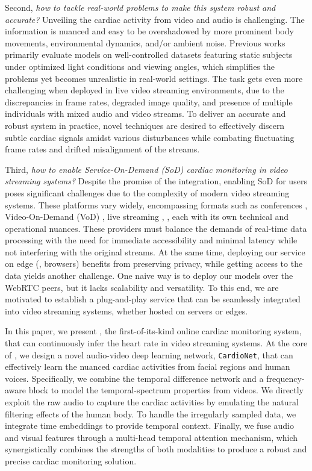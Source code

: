 Second, \textit{how to tackle real-world problems to make this system robust and accurate?} Unveiling the cardiac activity from video and audio is challenging. The information is nuanced and easy to be overshadowed by more prominent body movements, environmental dynamics, and/or ambient noise. Previous works \cite{liu2020multi, niu2020video, li2023learning, yu2023physformer++, liu2023efficientphys, zou2024rhythmformer} primarily evaluate models on well-controlled datasets featuring static subjects under optimized light conditions and viewing angles, which simplifies the problems yet becomes unrealistic in real-world settings. 
The task gets even more challenging when deployed in live video streaming environments, due to the discrepancies in frame rates, degraded image quality, and presence of multiple individuals with mixed audio and video streams. 
To deliver an accurate and robust system in practice, novel techniques are desired to effectively discern subtle cardiac signals amidst various disturbances while combating fluctuating frame rates and drifted misalignment of the streams. 

Third, \textit{how to enable Service-On-Demand (SoD) cardiac monitoring in video streaming systems?} Despite the promise of the integration,
enabling SoD for users poses significant challenges due to the complexity of modern video streaming systems. These platforms vary widely, encompassing formats such as conferences \cite{SkypeStayConnected, TeamsChannelsMicrosoft, OnePlatformConnect}, Video-On-Demand (VoD) \cite{StreamTVMovies, NetflixSingaporeWatch}, live streaming \cite{YouTube, ExploreFindYour}, \etc, each with its own technical and operational nuances. 
These providers must balance the demands of real-time data processing with the need for immediate accessibility and minimal latency while not interfering with the original streams. At the same time, deploying our service on edge (\eg, browsers) benefits from preserving privacy, while getting access to the data yields another challenge. One naive way is to deploy our models over the WebRTC peers, but it lacks scalability and versatility. To this end, we are motivated to establish a plug-and-play service that can be seamlessly integrated into video streaming systems, whether hosted on servers or edges. 



In this paper, we present \sysname, the first-of-its-kind online cardiac monitoring system, that can continuously infer the heart rate in video streaming systems. At the core of \sysname, we design a novel audio-video deep learning network, \texttt{CardioNet}, that can effectively learn the nuanced cardiac activities from facial regions and human voices. Specifically, we combine the temporal difference network and a frequency-aware block to model the temporal-spectrum properties from videos. 
We directly exploit the raw audio to capture the cardiac activities by emulating the natural filtering effects of the human body. To handle the irregularly sampled data, we integrate time embeddings to provide temporal context. 
Finally, we fuse audio and visual features through a multi-head temporal attention mechanism, which synergistically combines the strengths of both modalities to produce a robust and precise cardiac monitoring solution.

